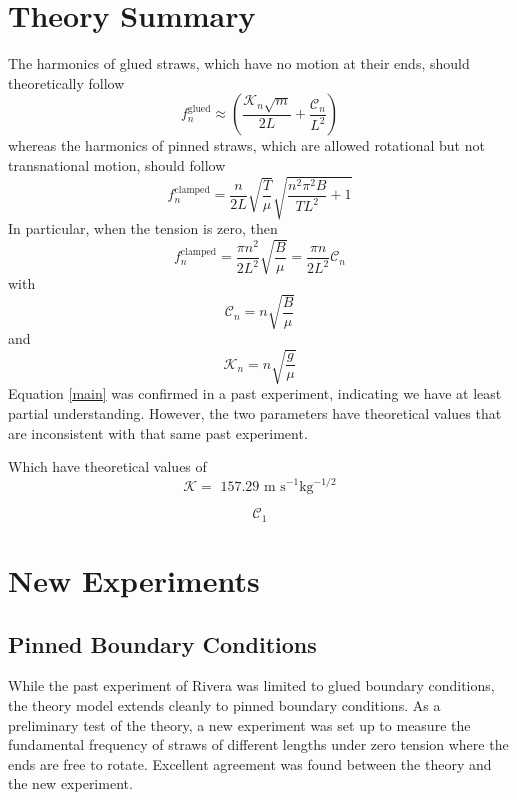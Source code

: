 \documentclass[twoside]{article}
\begin{document}
\begin{multicols}{2}
\section{Theory Summary}
The harmonics of glued straws, which have no motion at their ends, should theoretically follow
\begin{equation}
\label{main}
f^\text{glued}_n \approx   (\frac{\mathcal{K}_n\sqrt{m}}{2L}  +  \frac{\mathcal{C}_n}{L^2} )
\end{equation}
whereas the harmonics of pinned straws, which are allowed rotational but not transnational motion,  should follow
\begin{equation}
f^{\text{clamped}}_n =  \frac{n}{2L}\sqrt{\frac{T}{\mu}}  \sqrt{\frac{n^2\pi^2B}{TL^2} + 1}
\end{equation}
In particular, when the tension is zero, then
\begin{equation}
f^{\text{clamped}}_n =  \frac{\pi n^2}{2L^2} \sqrt{\frac{B}{\mu} } = \frac{\pi n}{2L^2} \mathcal{C}_n
\end{equation}
with
\begin{equation}
\mathcal{C}_n = n \sqrt{\frac{B}{\mu}}
\end{equation}
and 
\begin{equation}
\mathcal{K}_n = n\sqrt{\frac{g}{\mu}}
\end{equation}
Equation \ref{main} was confirmed in a past experiment, indicating we have at least partial understanding. However, the two parameters have theoretical values that are inconsistent with that same past experiment.

Which have theoretical values of 
\begin{equation}
\mathcal{K} =  \text{ 157.29  m s}^{-1} \text{kg}^{-1/2}
\end{equation}

\begin{equation}
\mathcal{C}_1
\end{equation}

 



\section{New Experiments}
\subsection{Pinned Boundary Conditions}
While the past experiment of Rivera was limited to glued boundary conditions, the theory model extends cleanly to pinned boundary conditions. As a preliminary test of the theory, a new experiment was set up to measure the fundamental frequency of straws of different lengths under zero tension where the ends are free to rotate. Excellent agreement was found between the theory and the new experiment.



\end{multicols}
\end{document}
